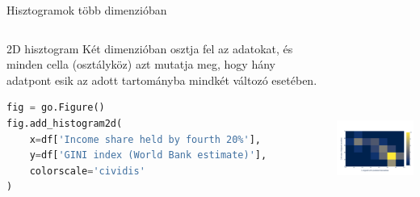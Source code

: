 \documentclass[english, aspectratio=169]{beamer}
\begin{document}
	\begin{frame}[fragile]{Hisztogramok több dimenzióban}
		\begin{columns}
			\begin{column}{.5\textwidth}
				\begin{block}{2D hisztogram}
					Két dimenzióban osztja fel az adatokat, és minden cella (osztályköz) azt mutatja meg, hogy hány adatpont esik az adott tartományba mindkét változó esetében. 
				\end{block}
				\begin{lstlisting}[language=python]
fig = go.Figure()
fig.add_histogram2d(
	x=df['Income share held by fourth 20%'],
	y=df['GINI index (World Bank estimate)'],
	colorscale='cividis'
)
				\end{lstlisting}
			\end{column}
			\begin{column}{.5\textwidth}
				\begin{center}
					\includegraphics[width=7cm, height=7cm, keepaspectratio]{images/freq_11.png}
				\end{center}
			\end{column}
		\end{columns}
	\end{frame}
	
\end{document}
